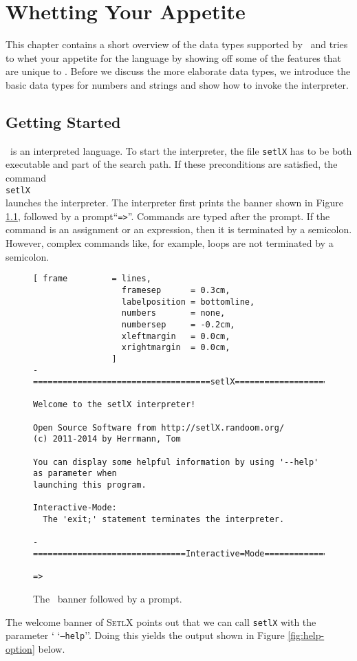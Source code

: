 \chapter{Whetting Your Appetite}
This chapter contains a short overview of the data types supported by
\setlx\ and tries to whet your appetite for the language by showing off some of
the features that are unique to \setlx.  Before we discuss the more elaborate data types,
we introduce the basic data types for numbers and strings and show how to invoke the interpreter.


\section{Getting Started}
\setlx\ is an interpreted language.  To start the interpreter,  the file
\texttt{setlX} has to be both executable and part of the search path.   If these
preconditions are satisfied, the command
\\[0.2cm]
\hspace*{1.3cm}
\texttt{setlX}
\\[0.2cm]
 launches the interpreter.  The interpreter first prints the banner shown in Figure
\ref{fig:banner}, followed by a prompt``\texttt{=>}''.  Commands are typed after the prompt.    
If the command is an assignment or an expression, then it is terminated by a semicolon.
However, complex commands like, for example, loops are not terminated by a semicolon.

\begin{figure}[!ht]
\centering
\begin{Verbatim}[ frame         = lines, 
                  framesep      = 0.3cm, 
                  labelposition = bottomline,
                  numbers       = none,
                  numbersep     = -0.2cm,
                  xleftmargin   = 0.0cm,
                  xrightmargin  = 0.0cm,
                ]
-====================================setlX=============================v2.3.1=-

Welcome to the setlX interpreter!

Open Source Software from http://setlX.randoom.org/
(c) 2011-2014 by Herrmann, Tom

You can display some helpful information by using '--help' as parameter when
launching this program.

Interactive-Mode:
  The 'exit;' statement terminates the interpreter.

-===============================Interactive=Mode==============================-

=> 
\end{Verbatim}
\vspace*{-0.3cm}
\caption{The \setlx\ banner followed by a prompt.}
\label{fig:banner}
\end{figure}
\noindent
The welcome banner of \textsc{SetlX} points out that we can call \texttt{setlX} with the parameter `
`\texttt{--help}''.   Doing this yields the output shown in Figure \ref{fig:help-option} below. 

